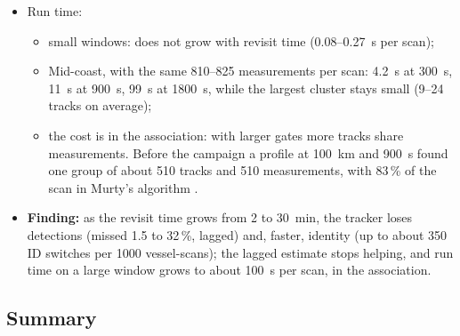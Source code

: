 \begin{itemize}
    \item Run time:
    \begin{itemize}
        \item small windows: does not grow with revisit time (0.08--0.27~s per scan);
        \item Mid-coast, with the same 810--825 measurements per scan: 4.2~s at 300~s, 11~s at 900~s, 99~s at 1800~s, while the largest cluster stays small (9--24 tracks on average);
        \item the cost is in the association: with larger gates more tracks share measurements. Before the campaign a profile at 100~km and 900~s found one group of about 510 tracks and 510 measurements, with 83\,\% of the scan in Murty's algorithm .
    \end{itemize}
    \item \textbf{Finding:} as the revisit time grows from 2 to 30~min, the tracker loses detections (missed 1.5 to 32\,\%, lagged) and, faster, identity (up to about 350 ID switches per 1000 vessel-scans); the lagged estimate stops helping, and run time on a large window grows to about 100~s per scan, in the association.
\end{itemize}

\subsection{Summary}
\label{sec:res-summary}

